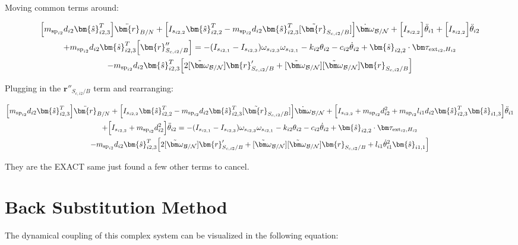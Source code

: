 \documentclass[paper]{aiaaNew}
\begin{document}
Moving common terms around:

\begin{multline}
\Big[m_{\text{sp}_{i2}} d_{i2}\bm{\hat{s}}_{i2,3}^T\Big] \ddot{\bm{r}}_{B/N} + \Big[I_{s_{i2,2}} \bm{\hat{s}}_{i2,2}^T - m_{\text{sp}_{i2}} d_{i2}\bm{\hat{s}}_{i2,3}^T  [\tilde{\bm{r}}_{S_{c,i2}/B}] \Big] \dot{\bm \omega}_{\cal{B/N}} + \Big[I_{s_{i2,2}}\Big] \ddot{\theta}_{i1}  + \Big[I_{s_{i2,2}}\Big] \ddot{\theta}_{i2} \\+ m_{\text{sp}_{i2}} d_{i2}\bm{\hat{s}}_{i2,3}^T \Big[ \bm{r}''_{S_{c,i2}/B}\Big] 
= - (I_{s_{i2,1}} - I_{s_{i2,3}}) \omega_{s_{i2,3}} \omega_{s_{i2,1}} -k_{i2} \theta_{i2} - c_{i2} \dot{\theta}_{i2}
+ \bm{\hat{s}}_{i2,2} \cdot \bm \tau_{\text{ext}_{i2},H_{i2}} \\
- m_{\text{sp}_{i2}} d_{i2}\bm{\hat{s}}_{i2,3}^T \Big[ 2 [\tilde{\bm\omega}_{\cal B/N}] \bm{r}'_{S_{c,i2}/B} 
+ [\tilde{\bm\omega}_{\cal B/N}] [\tilde{\bm\omega}_{\cal B/N}] \bm{r}_{S_{c,i2}/B}\Big]
\end{multline}

Plugging in the $\bm{r}''_{S_{c,i2}/B}$ term and rearranging:

\begin{multline}
	\Big[m_{\text{sp}_{i2}} d_{i2}\bm{\hat{s}}_{i2,3}^T\Big] \ddot{\bm{r}}_{B/N} + \Big[I_{s_{i2,2}} \bm{\hat{s}}_{i2,2}^T - m_{\text{sp}_{i2}} d_{i2}\bm{\hat{s}}_{i2,3}^T  [\tilde{\bm{r}}_{S_{c,i2}/B}] \Big] \dot{\bm \omega}_{\cal{B/N}} + \Big[I_{s_{i2,2}}+ m_{\text{sp}_{i2}} d_{i2}^2 + m_{\text{sp}_{i2}} l_{i1} d_{i2} \bm{\hat{s}}_{i2,3}^T \bm{\hat{s}}_{i1,3} \Big] \ddot{\theta}_{i1}  \\
	+ \Big[I_{s_{i2,2}} + m_{\text{sp}_{i2}} d_{i2}^2 \Big] \ddot{\theta}_{i2} 
	= - (I_{s_{i2,1}} - I_{s_{i2,3}}) \omega_{s_{i2,3}} \omega_{s_{i2,1}} -k_{i2} \theta_{i2} - c_{i2} \dot{\theta}_{i2}
	+ \bm{\hat{s}}_{i2,2} \cdot \bm \tau_{\text{ext}_{i2},H_{i2}} \\
	- m_{\text{sp}_{i2}} d_{i2}\bm{\hat{s}}_{i2,3}^T \Big[ 2 [\tilde{\bm\omega}_{\cal B/N}] \bm{r}'_{S_{c,i2}/B} 
	+ [\tilde{\bm\omega}_{\cal B/N}] [\tilde{\bm\omega}_{\cal B/N}] \bm{r}_{S_{c,i2}/B} + l_{i1} \dot{\theta}_{i1}^2 \bm{\hat{s}}_{i1,1}\Big]
\end{multline}

They are the EXACT same just found a few other terms to cancel.

	\section{Back Substitution Method}
	The dynamical coupling of this complex system can be visualized in the following equation:
	
\end{document}
